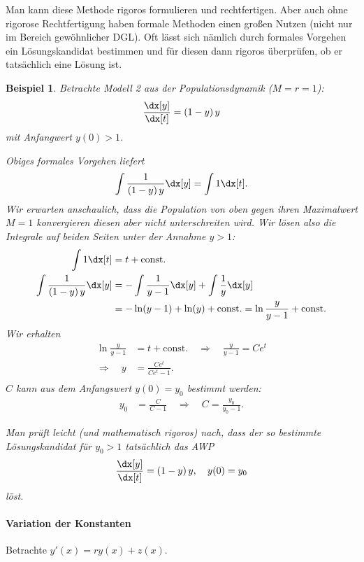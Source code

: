 \documentclass[
]{mycourse}
\theoremstyle{mythm}
\newtheorem{beispiel}[theorem]{Beispiel}
\theoremstyle{break}
\begin{document}
Man kann diese Methode rigoros formulieren und rechtfertigen. %
Aber auch ohne rigorose Rechtfertigung haben formale Methoden einen großen Nutzen
(nicht nur im Bereich gewöhnlicher DGL). Oft lässt sich nämlich durch formales Vorgehen ein Lösungskandidat bestimmen und für diesen dann rigoros überprüfen, ob er tatsächlich eine Lösung ist. 


\begin{beispiel}
Betrachte Modell 2 aus der Populationsdynamik ($M=r=1$):
\begin{align*}
\frac{\dx[y]}{\dx[t]} = \left(1-y\right) y
\end{align*}
mit Anfangwert $y(0)>1$. 

Obiges formales Vorgehen liefert
\[
\int \frac{1}{\left(1-y\right)y} \dx[y]  =\int 1 \dx[t].
\]
Wir erwarten anschaulich, dass die Population von oben gegen ihren Maximalwert $M=1$ konvergieren 
diesen aber nicht unterschreiten wird. Wir lösen also die Integrale auf beiden Seiten unter der
Annahme $y>1$:
\begin{align*}
\int 1 \dx[t] &= t + \mbox{const.}\\
\int \frac{1}{\left(1-y\right)y} \dx[y] 
&= - \int \frac{1}{y-1} \dx[y] + \int \frac{1}{y} \dx[y]\\
&= - \ln (y-1) + \ln (y) + \mbox{const.}=\ln \frac{y}{y-1} + \mbox{const.}
\end{align*}
Wir erhalten
\begin{align*}
\ln \frac{y}{y-1} &= t + \mbox{const.} \quad 
\Longrightarrow \quad \frac{y}{y-1} = C e^t\\
\Longrightarrow \quad y &= \frac{Ce^t}{Ce^t-1}.\\
\end{align*}
$C$ kann aus dem Anfangswert $y(0)=y_0$ bestimmt werden:
\begin{align*}
y_0 &= \frac{C}{C-1} \quad \Longrightarrow \quad  C=\frac{y_0}{y_0-1}.
\end{align*}

Man prüft leicht (und mathematisch rigoros) nach, dass der so bestimmte Lösungskandidat für $y_0>1$ tatsächlich
das AWP
\[
\frac{\dx[y]}{\dx[t]} =\left(1-y\right) y,  \quad y(0)=y_0
\]
löst. 
\end{beispiel}

\paragraph{Variation der Konstanten}

Betrachte $y'(x)=r y(x) + z(x)$.
\end{document}
